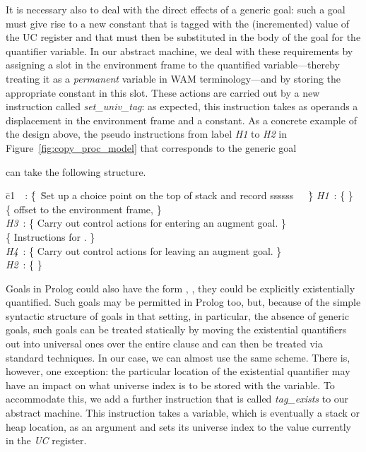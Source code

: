 It is necessary also to deal with the direct effects of a generic
goal: such a goal must give rise to a new constant that is tagged with
the (incremented) value of the UC register and that must then be
substituted in the body of the goal for the quantifier variable. In
our abstract machine, we deal with these requirements by assigning a
slot in the environment frame to the quantified variable---thereby
treating it as a {\em permanent} variable in WAM terminology---and by
storing the appropriate constant in this slot. These actions are
carried out by a new instruction called {\it set\_univ\_tag}: as
expected, this instruction takes as operands a displacement in the
environment frame and a constant.
As a concrete example of the design above, the pseudo instructions
from label {\it H1} to {\it H2} in Figure~\ref{fig:copy_proc_model} that
corresponds to the generic goal

can take the following structure.
\begin{tabbing}
\quad\= c1\ \ : \=\{\ \=Set up a choice point on the top of stack and record ssssss\ \ \ \=\}\kill
\> {\it H1}\ :  \>\{                                                                           \>\} \\
\>              \>\{  offset to the environment frame,                                \>\} \\
\> {\it H3}\ :  \>\{ \>Carry out control actions for entering an augment goal.                                       \>\} \\
\>              \>\{ \>Instructions for .                                                    \>\} \\
\> {\it H4}\ :  \>\{ \>Carry out control actions for leaving an augment goal.                                        \>\} \\
\> {\it H2}\ :  \>\{                                                                           \>\}
\end{tabbing}

Goals in Prolog could also have the form
, \ie, they could be explicitly existentially
quantified. Such goals may be permitted in Prolog too, but, because of
the simple syntactic structure of goals in that setting, in
particular, the absence of generic goals, such goals can be treated
statically by moving the existential quantifiers out into universal
ones over the entire clause and can then be treated via standard
techniques. In our case, we can almost use the same scheme. There is,
however, one exception: the particular location of the existential
quantifier may have an impact on what universe index is to be
stored with the variable. To accommodate this, we add a further
instruction that is called {\em tag\_exists} to our abstract
machine. This instruction takes a variable, which is eventually a stack
or heap location, as an argument and sets its universe index to the
value currently in the {\em UC} register.

